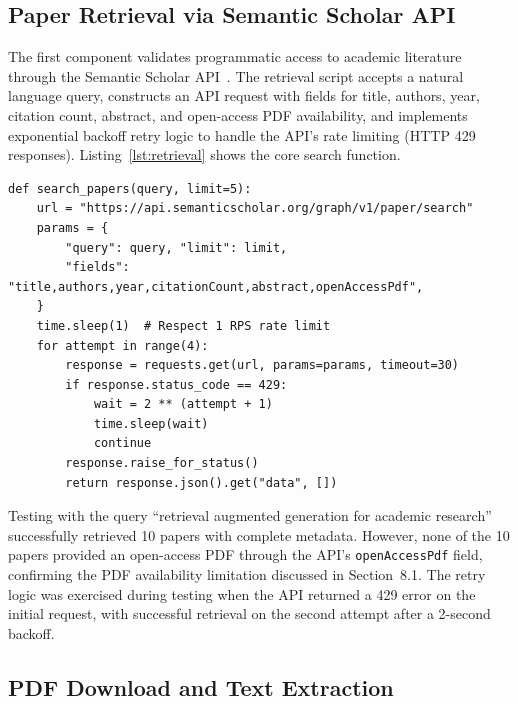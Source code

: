 \documentclass[12pt,a4paper]{article}
\begin{document}
\subsection{Paper Retrieval via Semantic Scholar API}

The first component validates programmatic access to academic literature through the Semantic Scholar API~\citep{ammar2018semanticscholar}. The retrieval script accepts a natural language query, constructs an API request with fields for title, authors, year, citation count, abstract, and open-access PDF availability, and implements exponential backoff retry logic to handle the API's rate limiting (HTTP 429 responses). Listing~\ref{lst:retrieval} shows the core search function.

\begin{lstlisting}[caption={Semantic Scholar API search with retry logic},label=lst:retrieval]
def search_papers(query, limit=5):
    url = "https://api.semanticscholar.org/graph/v1/paper/search"
    params = {
        "query": query, "limit": limit,
        "fields": "title,authors,year,citationCount,abstract,openAccessPdf",
    }
    time.sleep(1)  # Respect 1 RPS rate limit
    for attempt in range(4):
        response = requests.get(url, params=params, timeout=30)
        if response.status_code == 429:
            wait = 2 ** (attempt + 1)
            time.sleep(wait)
            continue
        response.raise_for_status()
        return response.json().get("data", [])
\end{lstlisting}

Testing with the query ``retrieval augmented generation for academic research'' successfully retrieved 10 papers with complete metadata. However, none of the 10 papers provided an open-access PDF through the API's \texttt{openAccessPdf} field, confirming the PDF availability limitation discussed in Section~8.1. The retry logic was exercised during testing when the API returned a 429 error on the initial request, with successful retrieval on the second attempt after a 2-second backoff.

\subsection{PDF Download and Text Extraction}
\end{document}

